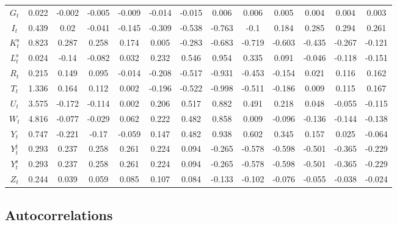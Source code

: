 \begin{tabular}{c|c|c|c|c|c|c|c|c|c|c|c|c|}
$G_{t}$ & 0.022 & -0.002 & -0.005 & -0.009 & -0.014 & -0.015 & 0.006 & 0.006 & 0.005 & 0.004 & 0.004 & 0.003 \\
$I_{t}$ & 0.439 & 0.02 & -0.041 & -0.145 & -0.309 & -0.538 & -0.763 & -0.1 & 0.184 & 0.285 & 0.294 & 0.261 \\
$K^{\mathrm{s}}_{t}$ & 0.823 & 0.287 & 0.258 & 0.174 & 0.005 & -0.283 & -0.683 & -0.719 & -0.603 & -0.435 & -0.267 & -0.121 \\
$L^{\mathrm{s}}_{t}$ & 0.024 & -0.14 & -0.082 & 0.032 & 0.232 & 0.546 & 0.954 & 0.335 & 0.091 & -0.046 & -0.118 & -0.151 \\
$R_{t}$ & 0.215 & 0.149 & 0.095 & -0.014 & -0.208 & -0.517 & -0.931 & -0.453 & -0.154 & 0.021 & 0.116 & 0.162 \\
$T_{t}$ & 1.336 & 0.164 & 0.112 & 0.002 & -0.196 & -0.522 & -0.998 & -0.511 & -0.186 & 0.009 & 0.115 & 0.167 \\
$U_{t}$ & 3.575 & -0.172 & -0.114 & 0.002 & 0.206 & 0.517 & 0.882 & 0.491 & 0.218 & 0.048 & -0.055 & -0.115 \\
$W_{t}$ & 4.816 & -0.077 & -0.029 & 0.062 & 0.222 & 0.482 & 0.858 & 0.009 & -0.096 & -0.136 & -0.144 & -0.138 \\
$Y_{t}$ & 0.747 & -0.221 & -0.17 & -0.059 & 0.147 & 0.482 & 0.938 & 0.602 & 0.345 & 0.157 & 0.025 & -0.064 \\
$Y^{\mathrm{j}}_{t}$ & 0.293 & 0.237 & 0.258 & 0.261 & 0.224 & 0.094 & -0.265 & -0.578 & -0.598 & -0.501 & -0.365 & -0.229 \\
$Y^{\mathrm{s}}_{t}$ & 0.293 & 0.237 & 0.258 & 0.261 & 0.224 & 0.094 & -0.265 & -0.578 & -0.598 & -0.501 & -0.365 & -0.229 \\
$Z_{t}$ & 0.244 & 0.039 & 0.059 & 0.085 & 0.107 & 0.084 & -0.133 & -0.102 & -0.076 & -0.055 & -0.038 & -0.024 \\
\hline
\end{tabular}


\subsection{Autocorrelations}

